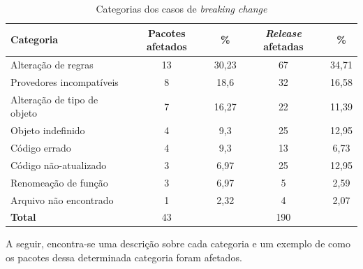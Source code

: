 \begin{table}[]
\begin{tabular}{|l|c|c|c|c|}
\hline
\centering
\textbf{Categoria}           & \textbf{Pacotes afetados} & \textbf{\%}   & \textbf{\textit{Release} afetadas} & \textbf{\%}    \\ \hline
Alteração de regras          & 13              & 30,23 & 67                          & 34,71 \\
Provedores incompatíveis     & 8               & 18,6  & 32                          & 16,58 \\
Alteração de tipo de objeto  & 7               & 16,27 & 22                          & 11,39 \\
Objeto indefinido            & 4               & 9,3   & 25                          & 12,95 \\
Código errado                & 4               & 9,3   & 13                          & 6,73  \\
Código não-atualizado        & 3               & 6,97  & 25                          & 12,95 \\
Renomeação de função         & 3               & 6,97  & 5                           & 2,59  \\
Arquivo não encontrado       & 1               & 2,32  & 4                           & 2,07  \\ \hline
\textbf{Total}               & 43              &       & 190                         &       \\ \hline
\end{tabular}
\caption{Categorias dos casos de \textit{breaking change}}
\label{tab:bc_category}
\end{table}

A seguir, encontra-se uma descrição sobre cada categoria e um exemplo de como os pacotes dessa determinada categoria foram afetados.

